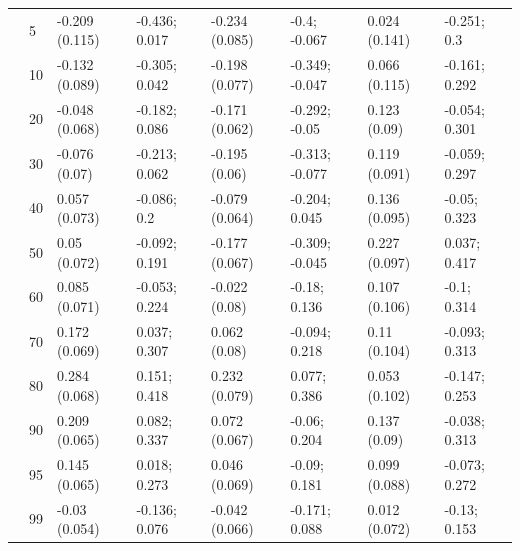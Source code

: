 \begin{landscape}
\begin{table}
{\begin{tabular}[t]{llllllll}
 & 5 & -0.209 (0.115) & -0.436; 0.017 & -0.234 (0.085) & -0.4; -0.067 & 0.024 (0.141) & -0.251; 0.3\\
 & 10 & -0.132 (0.089) & -0.305; 0.042 & -0.198 (0.077) & -0.349; -0.047 & 0.066 (0.115) & -0.161; 0.292\\
 & 20 & -0.048 (0.068) & -0.182; 0.086 & -0.171 (0.062) & -0.292; -0.05 & 0.123 (0.09) & -0.054; 0.301\\
 & 30 & -0.076 (0.07) & -0.213; 0.062 & -0.195 (0.06) & -0.313; -0.077 & 0.119 (0.091) & -0.059; 0.297\\
 & 40 & 0.057 (0.073) & -0.086; 0.2 & -0.079 (0.064) & -0.204; 0.045 & 0.136 (0.095) & -0.05; 0.323\\
 & 50 & 0.05 (0.072) & -0.092; 0.191 & -0.177 (0.067) & -0.309; -0.045 & 0.227 (0.097) & 0.037; 0.417\\
 & 60 & 0.085 (0.071) & -0.053; 0.224 & -0.022 (0.08) & -0.18; 0.136 & 0.107 (0.106) & -0.1; 0.314\\
 & 70 & 0.172 (0.069) & 0.037; 0.307 & 0.062 (0.08) & -0.094; 0.218 & 0.11 (0.104) & -0.093; 0.313\\
 & 80 & 0.284 (0.068) & 0.151; 0.418 & 0.232 (0.079) & 0.077; 0.386 & 0.053 (0.102) & -0.147; 0.253\\
 & 90 & 0.209 (0.065) & 0.082; 0.337 & 0.072 (0.067) & -0.06; 0.204 & 0.137 (0.09) & -0.038; 0.313\\
 & 95 & 0.145 (0.065) & 0.018; 0.273 & 0.046 (0.069) & -0.09; 0.181 & 0.099 (0.088) & -0.073; 0.272\\
 & 99 & -0.03 (0.054) & -0.136; 0.076 & -0.042 (0.066) & -0.171; 0.088 & 0.012 (0.072) & -0.13; 0.153\\
\bottomrule
\end{tabular}}
\end{table}
\end{landscape}
